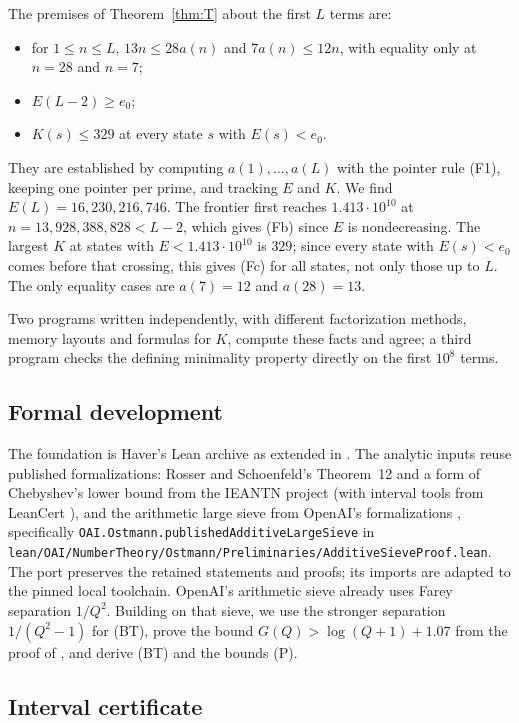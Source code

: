 \documentclass[11pt]{article}
\theoremstyle{definition}
\theoremstyle{remark}
\begin{document}
\begin{appendices}
The premises of Theorem~\ref{thm:T} about the first $L$ terms are:
\begin{itemize}
\item[(Fa)] for $1\le n\le L$, $13n\le28a(n)$ and $7a(n)\le12n$, with
  equality only at $n=28$ and $n=7$;
\item[(Fb)] $E(L-2)\ge e_0$;
\item[(Fc)] $K(s)\le329$ at every state $s$ with $E(s)<e_0$.
\end{itemize}
They are established by computing $a(1),\dots,a(L)$ with the pointer rule
(F1), keeping one pointer per prime, and tracking $E$ and $K$. We find
$E(L)=16{,}230{,}216{,}746$. The frontier first reaches
$1.413\cdot10^{10}$ at $n=13{,}928{,}388{,}828<L-2$, which gives (Fb) since
$E$ is nondecreasing. The largest $K$ at states with $E<1.413\cdot10^{10}$
is $329$; since every state with $E(s)<e_0$ comes before that crossing,
this gives (Fc) for all states, not only those up to $L$. The only
equality cases are $a(7)=12$ and $a(28)=13$.

Two programs written independently, with different factorization methods,
memory layouts and formulas for $K$, compute these facts and agree; a
third program checks the defining minimality property directly on the
first $10^8$ terms. 


\subsection{Formal development}

The foundation is Haver's Lean archive \cite{haver} as extended in
\cite{graham}. The analytic inputs reuse published formalizations:
Rosser and Schoenfeld's Theorem~12 and a form of Chebyshev's lower bound from the
IEANTN project \cite{ieantn} (with interval tools from LeanCert
\cite{leancert}), and the arithmetic large sieve from OpenAI's
formalizations \cite{oaimath}, specifically
\texttt{OAI.Ostmann.publishedAdditiveLargeSieve} in
\texttt{lean/OAI/NumberTheory/Ostmann/Preliminaries/AdditiveSieveProof.lean}.
The port preserves the retained statements and proofs; its imports are
adapted to the pinned local toolchain. OpenAI's arithmetic sieve already
uses Farey separation $1/Q^2$. Building on that sieve, we use the stronger
separation $1/(Q^2-1)$ for (BT), prove the bound
$G(Q)>\log(Q+1)+1.07$ from the proof of \cite[Lemma~7]{mv}, and derive
(BT) and the bounds (P).


\subsection{Interval certificate}\label{app:cover}


\end{appendices}
\end{document}
